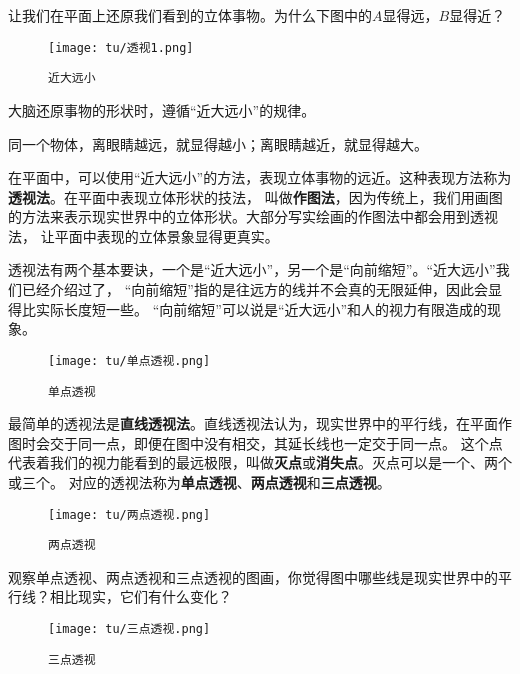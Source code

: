 \documentclass[12pt,UTF8]{ctexbook}
\theoremstyle{definition}
\theoremstyle{plain}
\begin{document}
让我们在平面上还原我们看到的立体事物。为什么下图中的$A$显得远，$B$显得近？

\begin{figure}[h] %
    \centering
    \texttt{[image: tu/透视1.png]}
    \caption*{\texttt{近大远小}}
\end{figure}

大脑还原事物的形状时，遵循“近大远小”的规律。

同一个物体，离眼睛越远，就显得越小；离眼睛越近，就显得越大。

在平面中，可以使用“近大远小”的方法，表现立体事物的远近。这种表现方法称为\textbf{透视法}。在平面中表现立体形状的技法，
叫做\textbf{作图法}，因为传统上，我们用画图的方法来表示现实世界中的立体形状。大部分写实绘画的作图法中都会用到透视法，
让平面中表现的立体景象显得更真实。

透视法有两个基本要诀，一个是“近大远小”，另一个是“向前缩短”。“近大远小”我们已经介绍过了，
“向前缩短”指的是往远方的线并不会真的无限延伸，因此会显得比实际长度短一些。
“向前缩短”可以说是“近大远小”和人的视力有限造成的现象。

\begin{figure}[h] %
    \centering
    \texttt{[image: tu/单点透视.png]}
    \caption*{\texttt{单点透视}}
\end{figure}

最简单的透视法是\textbf{直线透视法}。直线透视法认为，现实世界中的平行线，在平面作图时会交于同一点，即便在图中没有相交，其延长线也一定交于同一点。
这个点代表着我们的视力能看到的最远极限，叫做\textbf{灭点}或\textbf{消失点}。灭点可以是一个、两个或三个。
对应的透视法称为\textbf{单点透视}、\textbf{两点透视}和\textbf{三点透视}。

\begin{figure}[h] %
    \vspace{-4pt}
    \centering
    \texttt{[image: tu/两点透视.png]}
    \caption*{\texttt{两点透视}}
\end{figure}

观察单点透视、两点透视和三点透视的图画，你觉得图中哪些线是现实世界中的平行线？相比现实，它们有什么变化？

\begin{figure}[h] %
    \vspace{4pt}
    \centering
    \texttt{[image: tu/三点透视.png]}
    \caption*{\texttt{三点透视}}
\end{figure}
\end{document}
